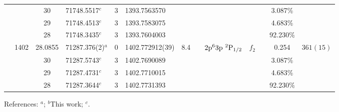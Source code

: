 \begin{table*}
\begin{center}
{\begin{tabular}{:l;l;c;l;c;l;c;l;l;c;c;c;c}
\rowstyle{\itshape}               &        & 30        & 71748.5517$^{c}$                 & 3 &  1393.7563570      &      & $                                        $ & $                                        $ & $      $ &              & 3.087\%   & $          $\\
\rowstyle{\itshape}               &        & 29        & 71748.4513$^{c}$                 & 3 &  1393.7583075      &      & $                                        $ & $                                        $ & $      $ &              & 4.683\%   & $          $\\
\rowstyle{\itshape}               &        & 28        & 71748.3435$^{c}$                 & 3 &  1393.7604003      &      & $                                        $ & $                                        $ & $      $ &              & 92.230\%  & $          $\\
                                  & 1402   & 28.0855   & 71287.376(2)$^{a}$               & 0 &   1402.772912(39)  &  8.4 & $                                        $ & $2\rm{p}^63\rm{p}~^2\rm{P}_{1/2}         $ & $f_{2} $ &              & 0.254     & $  361(15) $\\
\rowstyle{\itshape}               &        & 30        & 71287.5743$^{c}$                 & 3 &  1402.7690089      &      & $                                        $ & $                                        $ & $      $ &              & 3.087\%   & $          $\\
\rowstyle{\itshape}               &        & 29        & 71287.4731$^{c}$                 & 3 &  1402.7710015      &      & $                                        $ & $                                        $ & $      $ &              & 4.683\%   & $          $\\
\rowstyle{\itshape}               &        & 28        & 71287.3644$^{c}$                 & 3 &  1402.7731393      &      & $                                        $ & $                                        $ & $      $ &              & 92.230\%  & $          $\\
\hline
\end{tabular}
}
{\footnotesize References:
$^{a}$\citet{Griesmann:2000:L113};
$^{b}$This work;
$^{c}$\citet{Berengut:2003:022502}.}
\end{center}
\end{table*}
